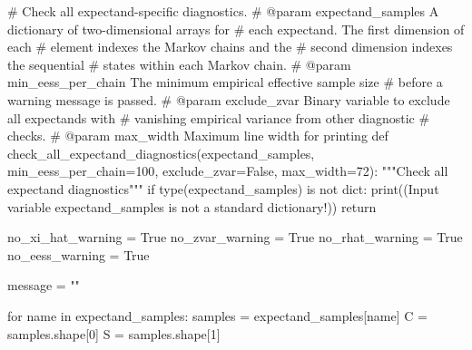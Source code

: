 \documentclass[
  letterpaper,
  DIV=11,
  numbers=noendperiod]{scrartcl}
\newenvironment{Shaded}{\begin{snugshade}}{\end{snugshade}}
\newcommand{\BuiltInTok}[1]{\textcolor[rgb]{0.00,0.23,0.31}{#1}}
\newcommand{\CommentTok}[1]{\textcolor[rgb]{0.37,0.37,0.37}{#1}}
\newcommand{\ControlFlowTok}[1]{\textcolor[rgb]{0.00,0.23,0.31}{#1}}
\newcommand{\DecValTok}[1]{\textcolor[rgb]{0.68,0.00,0.00}{#1}}
\newcommand{\KeywordTok}[1]{\textcolor[rgb]{0.00,0.23,0.31}{#1}}
\newcommand{\NormalTok}[1]{\textcolor[rgb]{0.00,0.23,0.31}{#1}}
\newcommand{\OperatorTok}[1]{\textcolor[rgb]{0.37,0.37,0.37}{#1}}
\newcommand{\StringTok}[1]{\textcolor[rgb]{0.13,0.47,0.30}{#1}}
\newcommand{\VariableTok}[1]{\textcolor[rgb]{0.07,0.07,0.07}{#1}}
\begin{document}
\begin{Shaded}
\begin{Highlighting}[]

\CommentTok{\# Check all expectand{-}specific diagnostics.}
\CommentTok{\# @param expectand\_samples A dictionary of two{-}dimensional arrays for }
\CommentTok{\#                          each expectand.  The first dimension of each}
\CommentTok{\#                          element indexes the Markov chains and the }
\CommentTok{\#                          second dimension indexes the sequential }
\CommentTok{\#                          states within each Markov chain.}
\CommentTok{\# @param min\_eess\_per\_chain The minimum empirical effective sample size}
\CommentTok{\#                           before a warning message is passed.}
\CommentTok{\# @param exclude\_zvar Binary variable to exclude all expectands with}
\CommentTok{\#                     vanishing empirical variance from other diagnostic}
\CommentTok{\#                     checks.}
\CommentTok{\# @param max\_width Maximum line width for printing}
\KeywordTok{def}\NormalTok{ check\_all\_expectand\_diagnostics(expectand\_samples,}
\NormalTok{                                    min\_eess\_per\_chain}\OperatorTok{=}\DecValTok{100}\NormalTok{,}
\NormalTok{                                    exclude\_zvar}\OperatorTok{=}\VariableTok{False}\NormalTok{,}
\NormalTok{                                    max\_width}\OperatorTok{=}\DecValTok{72}\NormalTok{):}
  \CommentTok{"""Check all expectand diagnostics"""}
  \ControlFlowTok{if} \BuiltInTok{type}\NormalTok{(expectand\_samples) }\KeywordTok{is} \KeywordTok{not} \BuiltInTok{dict}\NormalTok{:}
    \BuiltInTok{print}\NormalTok{((}\StringTok{\textquotesingle{}Input variable \textasciigrave{}expectand\_samples\textasciigrave{} \textquotesingle{}}
           \StringTok{\textquotesingle{}is not a standard dictionary!\textquotesingle{}}\NormalTok{))}
    \ControlFlowTok{return}
  
\NormalTok{  no\_xi\_hat\_warning }\OperatorTok{=} \VariableTok{True} 
\NormalTok{  no\_zvar\_warning }\OperatorTok{=} \VariableTok{True}
\NormalTok{  no\_rhat\_warning }\OperatorTok{=} \VariableTok{True}
\NormalTok{  no\_eess\_warning }\OperatorTok{=} \VariableTok{True}
  
\NormalTok{  message }\OperatorTok{=} \StringTok{""}
  
  \ControlFlowTok{for}\NormalTok{ name }\KeywordTok{in}\NormalTok{ expectand\_samples:}
\NormalTok{    samples }\OperatorTok{=}\NormalTok{ expectand\_samples[name]}
\NormalTok{    C }\OperatorTok{=}\NormalTok{ samples.shape[}\DecValTok{0}\NormalTok{]}
\NormalTok{    S }\OperatorTok{=}\NormalTok{ samples.shape[}\DecValTok{1}\NormalTok{]}
    

\end{Highlighting}
\end{Shaded}
\end{document}
